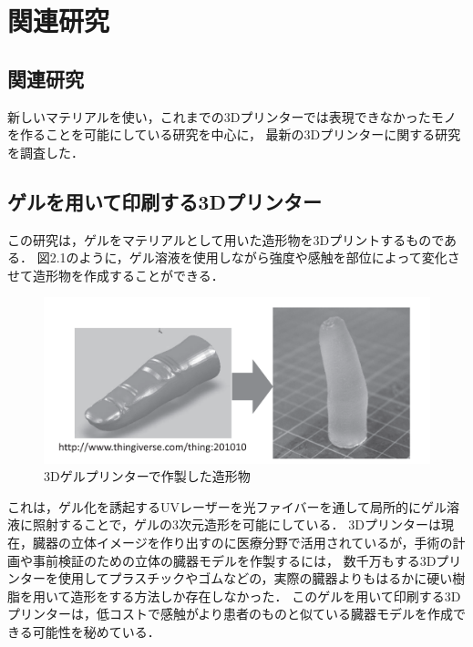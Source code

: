 \chapter{関連研究}
\label{chp:first}

\section{関連研究}
\label{sec:paragraph}
新しいマテリアルを使い，これまでの3Dプリンターでは表現できなかったモノを作ることを可能にしている研究を中心に，
最新の3Dプリンターに関する研究を調査した．


\section{ゲルを用いて印刷する3Dプリンター\cite{a}}
\label{sec:enum}

この研究は，ゲルをマテリアルとして用いた造形物を3Dプリントするものである．
図2.1のように，ゲル溶液を使用しながら強度や感触を部位によって変化させて造形物を作成することができる．

\begin{figure}[H]
  \centering
  \includegraphics[width=14truecm]{./fig/geru3D.png}
  \caption{3Dゲルプリンターで作製した造形物}
  \label{fig:ss}
\end{figure}

これは，ゲル化を誘起するUVレーザーを光ファイバーを通して局所的にゲル溶液に照射することで，ゲルの3次元造形を可能にしている．
3Dプリンターは現在，臓器の立体イメージを作り出すのに医療分野で活用されているが，手術の計画や事前検証のための立体の臓器モデルを作製するには，
数千万もする3Dプリンターを使用してプラスチックやゴムなどの，実際の臓器よりもはるかに硬い樹脂を用いて造形をする方法しか存在しなかった．
このゲルを用いて印刷する3Dプリンターは，低コストで感触がより患者のものと似ている臓器モデルを作成できる可能性を秘めている．

